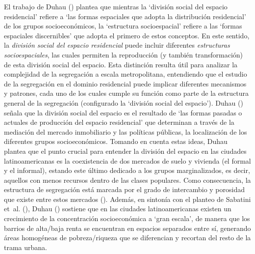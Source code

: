 \documentclass[
  spanish,
  a4paper,%
  chapterprefix=true,%
  DIV=calc,%
  twoside]{scrbook}%
\begin{document}
El trabajo de Duhau () plantea que mientras la `división
social del espacio residencial' refiere a `las formas espaciales que
adopta la distribución residencial' de los grupos socioeconómicos, la
`estructura socioespacial' refiere a las `formas espaciales
discernibles' que adopta el primero de estos conceptos. En este sentido,
la \emph{división social del espacio residencial} puede incluir diferentes
\emph{estructuras socioespaciales}, las cuales permiten la reproducción (y
también transformación) de esta división social del espacio. Esta
distinción resulta útil para analizar la complejidad de la segregación a
escala metropolitana, entendiendo que el estudio de la segregación en el
dominio residencial puede implicar diferentes mecanismos y patrones,
cada uno de los cuales cumple su función como parte de la estructura
general de la segregación (configurado la `división social del
espacio'). Duhau () señala que la división social del espacio
es el resultado de `las formas pasadas o actuales de producción del
espacio residencial' que determinan a través de la mediación del mercado
inmobiliario y las políticas públicas, la localización de los diferentes
grupos socioeconómicos. Tomando en cuenta estas ideas, Duhau plantea que
el punto crucial para entender la división del espacio en las ciudades
latinoamericanas es la coexistencia de dos mercados de suelo y vivienda
(el formal y el informal), estando este último dedicado a los grupos
marginalizados, es decir, aquellos con menos recursos dentro de las
clases populares. Como consecuencia, la estructura de segregación está
marcada por el grado de intercambio y porosidad que existe entre estos
mercados (). Además, en sintonía con el planteo de
Sabatini et~al. (), Duhau () sostiene que en las ciudades latinoamericanas
existen un crecimiento de la concentración socioeconómica a `gran
escala', de manera que los barrios de alta/baja renta se encuentran en
espacios separados entre sí, generando áreas homogéneas de
pobreza/riqueza que se diferencian y recortan del resto de la trama
urbana.
\end{document}
